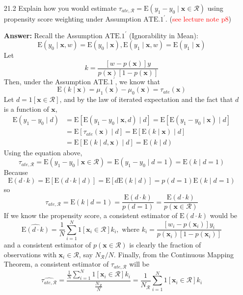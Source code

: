 \begin{enumerate}
    
    \item[21.2] Explain how you would estimate $\tau_{ate, \mathcal{R}}=\mathrm{E}\left(y_{1}-y_{0} \mid \mathbf{x} \in \mathcal{R}\right)$ using propensity score weighting under Assumption $\text{ATE.}1^\prime$. (\textcolor{red}{see lecture note p8})
    
    \textbf{Answer:} Recall the Assumption $\text{ATE.}1^\prime$ (Ignorability in Mean):
    \[ \mathrm{E}(y_0 \mid \mathbf{x},w) = \mathrm{E}(y_0 \mid \mathbf{x}), \mathrm{E}(y_1 \mid \mathbf{x},w) = \mathrm{E}(y_1 \mid \mathbf{x}) \]
    Let
    \[ k = \frac{[w-p(\mathbf{x})] y}{p(\mathbf{x})[1-p(\mathbf{x})]} \]
    Then, under the Assumption $\text{ATE.}1^\prime$, we know that
    \[ \mathrm{E}(k \mid \mathbf{x})=\mu_{1}(\mathbf{x})-\mu_{0}(\mathbf{x})=\tau_{ate}(\mathbf{x}) \]
    Let $d = 1[\mathbf{x}\in\mathcal{R}]$, and by the law of iterated expectation and the fact that $d$ is a function of $\mathbf{x}$,
    \begin{align*}
        \mathrm{E}\left(y_{1}-y_{0} \mid d\right) &= \mathrm{E}\left[\mathrm{E}\left(y_{1}-y_{0} \mid \mathbf{x}, d\right) \mid d\right]=\mathrm{E}\left[\mathrm{E}\left(y_{1}-y_{0} \mid \mathbf{x}\right) \mid d\right] \\
        &= \mathrm{E}\left[\tau_{ate}(\mathbf{x}) \mid d\right]=\mathrm{E}[\mathrm{E}(k \mid \mathbf{x}) \mid d] \\
        &= \mathrm{E}[\mathrm{E}(k \mid d,\mathbf{x}) \mid d] = \mathrm{E}(k \mid d)
    \end{align*}
    Using the equation above,
    \[ \tau_{ate, \mathcal{R}}=\mathrm{E}\left(y_{1}-y_{0} \mid \mathbf{x} \in \mathcal{R}\right) = \mathrm{E}\left(y_{1}-y_{0} \mid d=1\right) = \mathrm{E}(k \mid d=1) \]
    Because
    \[ \mathrm{E}(d \cdot k)= \mathrm{E} \left[\mathrm{E}(d \cdot k \mid d)\right] = \mathrm{E}\left[d \mathrm{E}(k \mid d)\right] =p(d=1) \mathrm{E}(k \mid d=1) \]
    so
    \[ \tau_{ate, \mathcal{R}} = \mathrm{E}(k \mid d=1) = \frac{\mathrm{E}(d \cdot k)}{p(d=1)} = \frac{\mathrm{E}(d \cdot k)}{p(\mathbf{x}\in\mathcal{R})} \]
    If we know the propensity score, a consistent estimator of $\mathrm{E}(d \cdot k)$ would be
    \[ \widehat{\mathrm{E}(d \cdot k)} = \frac{1}{N} \sum_{i=1}^{N} 1\left[\mathbf{x}_{i} \in \mathcal{R}\right] k_{i}, \text{ where } k_i = \frac{[w_i-p(\mathbf{x}_i)] y_i}{p(\mathbf{x}_i)[1-p(\mathbf{x}_i)]} \]
    and a consistent estimator of $p(\mathbf{x} \in \mathcal{R})$ is clearly the fraction of observations with $\mathbf{x}_{i} \in \mathcal{R}$, say $N_{\mathcal{R}}/N$. Finally, from the Continuous Mapping Theorem, a consistent estimator of $\tau_{ate, \mathcal{R}}$ will be
    \[ \widehat{\tau_{ate, \mathcal{R}}} = \frac{ \displaystyle\frac{1}{N} \sum_{i=1}^{N} 1\left[\mathbf{x}_{i} \in \mathcal{R}\right] k_{i}}{\displaystyle\frac{N_{\mathcal{R}}}{N}} = \frac{1}{N_{\mathcal{R}}} \sum_{i=1}^{N} 1\left[\mathbf{x}_{i} \in \mathcal{R}\right] k_{i} \]
\end{enumerate}
